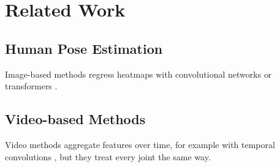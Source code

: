 \section{Related Work}
\label{sec:related}

\subsection{Human Pose Estimation}
Image-based methods regress heatmaps with convolutional networks
\citep{cao2017realtime} or transformers \citep{vaswani2017attention}.

\subsection{Video-based Methods}
Video methods aggregate features over time, for example with temporal
convolutions \citep{pavllo2019videopose}, but they treat every joint the same way.
